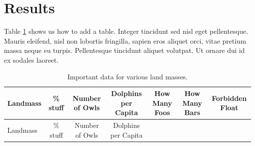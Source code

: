 \documentclass[12pt,a4paper,]{report}
\begin{document}
\hypertarget{results-2}{%
\section{Results}\label{results-2}}

Table \ref{tbl:random} shows us how to add a table. Integer tincidunt
sed nisl eget pellentesque. Mauris eleifend, nisl non lobortis
fringilla, sapien eros aliquet orci, vitae pretium massa neque eu
turpis. Pellentesque tincidunt aliquet volutpat. Ut ornare dui id ex
sodales laoreet.

\newpage

\begin{longtable}[]{@{}lcccccc@{}}
\caption{Important data for various land masses.
\label{tbl:random}}\tabularnewline
\toprule
\begin{minipage}[b]{0.12\columnwidth}\raggedright
Landmass\strut
\end{minipage} & \begin{minipage}[b]{0.08\columnwidth}\centering
\% stuff\strut
\end{minipage} & \begin{minipage}[b]{0.10\columnwidth}\centering
Number of Owls\strut
\end{minipage} & \begin{minipage}[b]{0.14\columnwidth}\centering
Dolphins per Capita\strut
\end{minipage} & \begin{minipage}[b]{0.12\columnwidth}\centering
How Many Foos\strut
\end{minipage} & \begin{minipage}[b]{0.12\columnwidth}\centering
How Many Bars\strut
\end{minipage} & \begin{minipage}[b]{0.12\columnwidth}\centering
Forbidden Float\strut
\end{minipage}\tabularnewline
\midrule
\endfirsthead
\toprule
\begin{minipage}[b]{0.12\columnwidth}\raggedright
Landmass\strut
\end{minipage} & \begin{minipage}[b]{0.08\columnwidth}\centering
\% stuff\strut
\end{minipage} & \begin{minipage}[b]{0.10\columnwidth}\centering
Number of Owls\strut
\end{minipage} & \begin{minipage}[b]{0.14\columnwidth}\centering
Dolphins per Capita\strut

\end{minipage}
\end{longtable}
\end{document}
